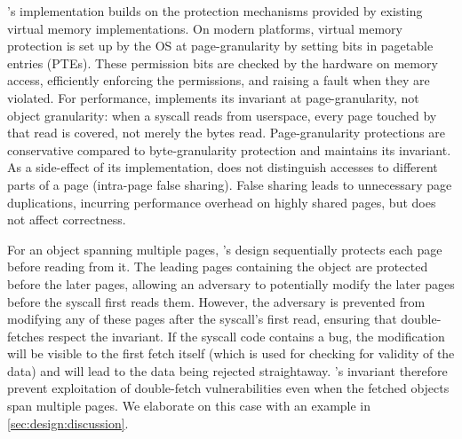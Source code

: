 \documentclass[letterpaper,twocolumn,10pt]{article}
\begin{document}
\tiktok's implementation builds on the protection mechanisms provided by 
existing virtual memory implementations.
On modern platforms, virtual memory protection is set up by the OS at
page-granularity by setting bits in pagetable entries (PTEs).
These permission bits are checked by the hardware on memory access, 
efficiently enforcing the permissions, and raising a fault when they 
are violated.
For performance, \tiktok implements its invariant at page-granularity, not object 
granularity: when a syscall reads from userspace, every page touched by that 
read is covered, not merely the bytes read.
Page-granularity protections are conservative compared to byte-granularity
protection and \tiktok maintains its invariant.
As a side-effect of its implementation, \tiktok does not distinguish
accesses to different parts of a page (intra-page false sharing).
False sharing leads to unnecessary page duplications, incurring performance 
overhead on highly shared pages, but does not affect correctness.

For an object spanning multiple pages, \tiktok's design sequentially 
protects each page before reading from it.
The leading pages containing the object are protected before the
later pages, allowing an adversary to potentially modify the later 
pages before the syscall first reads them.
However, the adversary is prevented from modifying any of these pages
after the syscall's first read, ensuring that double-fetches respect
the invariant.
If the syscall code contains a \tocttou bug, the modification will
be visible to the first fetch itself (which is used for checking for 
validity of the data) and will lead to the data being rejected 
straightaway.
\tiktok's invariant therefore prevent exploitation of double-fetch
vulnerabilities even when the fetched objects span multiple pages.
We elaborate on this case with an example in \autoref{sec:design:discussion}.
\end{document}
